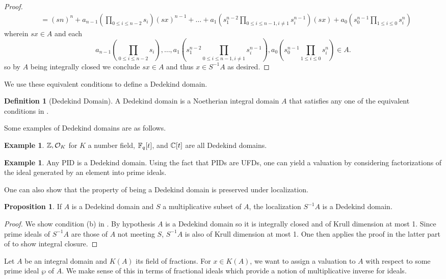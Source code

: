 \documentclass{amsart}
\theoremstyle{definition}
\newtheorem{example}[theorem]{Example}
\newtheorem{proposition}[theorem]{Proposition}
\newtheorem{definition}[theorem]{Definition}
\numberwithin{equation}{section}
\begin{document}
\begin{proof}
\begin{align*}
    &= (sn)^{n} + a_{n-1}\left(\prod_{0\leq i\leq n-2}s_{i}\right)(sx)^{n-1}+\dots+a_{1}\left(s_{1}^{n-2}\prod_{0\leq i\leq n-1, i\neq 1}s_{i}^{n-1}\right)(sx)+a_{0}\left(s_{0}^{n-1}\prod_{1\leq i\leq 0}s_{i}^{n}\right)
  \end{align*}
  \normalsize
  wherein $sx\in A$ and each 
  \small
  $$a_{n-1}\left(\prod_{0\leq i\leq n-2}s_{i}\right), \dots, a_{1}\left(s_{1}^{n-2}\prod_{0\leq i\leq n-1, i\neq 1}s_{i}^{n-1}\right), a_{0}\left(s_{0}^{n-1}\prod_{1\leq i\leq 0}s_{i}^{n}\right)\in A.$$
  \normalsize
  so by $A$ being integrally closed we conclude $sx\in A$ and thus $x\in S^{-1}A$ as desired. 
\end{proof}
We use these equivalent conditions to define a Dedekind domain. 
\begin{definition}[Dedekind Domain]
  A Dedekind domain is a Noetherian integral domain $A$ that satisfies any one of the equivalent conditions in . 
\end{definition}
Some examples of Dedekind domains are as follows. 
\begin{example}
  $\mathbb{Z}, \mathcal{O}_{K}$ for $K$ a number field, $\mathbb{F}_{q}[t]$, and $\mathbb{C}[t]$ are all Dedekind domains. 
\end{example}
\begin{example}
  Any PID is a Dedekind domain. Using the fact that PIDs are UFDs, one can yield a valuation by considering factorizations of the ideal generated by an element into prime ideals. 
\end{example}
One can also show that the property of being a Dedekind domain is preserved under localization. 
\begin{proposition}
  If $A$ is a Dedekind domain and $S$ a multiplicative subset of $A$, the localization $S^{-1}A$ is a Dedekind domain. 
\end{proposition}
\begin{proof}
  We show condition (b) in . By hypothesis $A$ is a Dedekind domain so it is integrally closed and of Krull dimension at most 1. Since prime ideals of $S^{-1}A$ are those of $A$ not meeting $S$, $S^{-1}A$ is also of Krull dimension at most 1. One then applies the proof in the latter part of  to show integral closure. 
\end{proof}
Let $A$ be an integral domain and $K(A)$ its field of fractions. For $x\in K(A)$, we want to assign a valuation to $A$ with respect to some prime ideal $\wp$ of $A$. We make sense of this in terms of fractional ideals which provide a notion of multiplicative inverse for ideals. 
\end{document}
